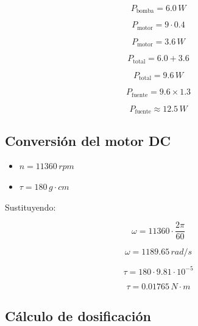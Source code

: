 \documentclass[conference]{IEEEtran}
\begin{document}
\begin{equation}
P_{\text{bomba}} = 6.0\,W
\end{equation}

\begin{equation}
P_{\text{motor}} = 9 \cdot 0.4
\end{equation}

\begin{equation}
P_{\text{motor}} = 3.6\,W
\end{equation}

\begin{equation}
P_{\text{total}} = 6.0 + 3.6
\end{equation}

\begin{equation}
P_{\text{total}} = 9.6\,W
\end{equation}

\begin{equation}
P_{\text{fuente}} = 9.6 \times 1.3
\end{equation}

\begin{equation}
P_{\text{fuente}} \approx 12.5\,W
\end{equation}

\subsection{Conversi\'on del motor DC}

\begin{itemize}
    \item $n = 11360\,rpm$
    \item $\tau = 180\,g\cdot cm$
\end{itemize}

Sustituyendo:

\begin{equation}
\omega = 11360 \cdot \frac{2\pi}{60}
\end{equation}

\begin{equation}
\omega = 1189.65\,rad/s
\end{equation}

\begin{equation}
\tau = 180 \cdot 9.81 \cdot 10^{-5}
\end{equation}

\begin{equation}
\tau = 0.01765\,N\cdot m
\end{equation}

\subsection{C\'alculo de dosificaci\'on}
\end{document}
